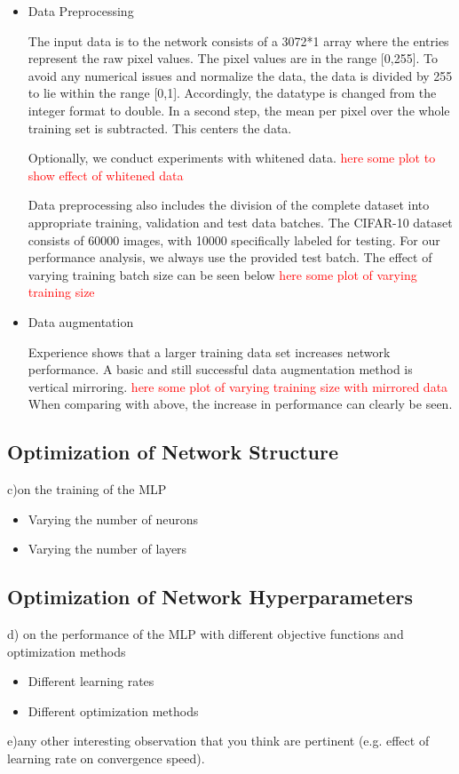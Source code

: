 \begin{itemize}
   	\item Data Preprocessing
  	
  	The input data is to the network consists of a 3072*1 array where the entries represent the raw pixel values. The pixel values are in the range [0,255]. To avoid any numerical issues and normalize the data, the data is divided by 255 to lie within the range [0,1]. Accordingly, the datatype is changed from the integer format to double. In a second step, the mean per pixel over the whole training set is subtracted. This centers the data.
  	
  	Optionally, we conduct experiments with whitened data. \textcolor{red}{here some plot to show effect of whitened data}
  	
  	Data preprocessing also includes the division of the complete dataset into appropriate training, validation and test data batches. The CIFAR-10 dataset consists of 60000 images, with 10000 specifically labeled for testing. For our performance analysis, we always use the provided test batch. The effect of varying training batch size can be seen below \textcolor{red}{here some plot of varying training size}
  	
   	\item Data augmentation
	    	
   	Experience shows that a larger training data set increases network performance. A basic and still successful data augmentation method is vertical mirroring. \textcolor{red}{here some plot of varying training size with mirrored data} When comparing with above, the increase in performance can clearly be seen.
   	
\end{itemize}
	    
\subsection{Optimization of Network Structure}\label{subsec:netStruct}
c)on the training of the MLP    
\begin{itemize}
   	\item Varying the number of neurons	
	\item Varying the number of layers	    	
\end{itemize}
	    
\subsection{Optimization of Network Hyperparameters}\label{subsec:optNet}
d) on the performance of the MLP with different objective functions and optimization methods
\begin{itemize}
   	\item Different learning rates
	    	
   	\item Different optimization methods
\end{itemize}
e)any other interesting observation that you think are pertinent (e.g. effect of learning rate on convergence speed).